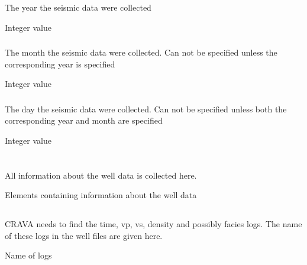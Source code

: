  \subsubsection{}
 \slist
   \item \Description The year the seismic data were collected
   \item \Argument Integer value
   \item \Default 
 \elist

 \subsubsection{}
 \slist
   \item \Description The month the seismic data were collected. Can not be specified unless the corresponding year is specified
   \item \Argument Integer value
   \item \Default 
 \elist
 
  \subsubsection{}
 \slist
   \item \Description The day the seismic data were collected. Can not be specified unless both the corresponding year and month are specified
   \item \Argument Integer value
   \item \Default 
 \elist


\section{} 
 \slist
   \item \Description All information about the well data is collected here.
   \item \Argument Elements containing information about the well data
   \item \Default
 \elist

\subsection{} 
 \slist
   \item \Description CRAVA needs to find the time, vp, vs, density and possibly facies logs. The name of these logs in the well files are given here.
   \item \Argument Name of logs
   \item \Default
 \elist

